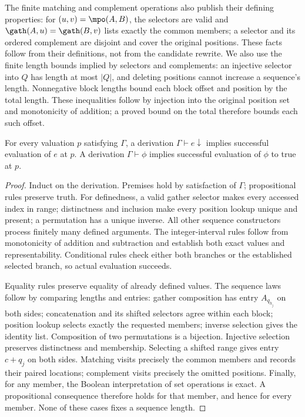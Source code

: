 The finite matching and complement operations also publish their defining
properties: for $(u,v)=\mpo(A,B)$, the selectors are valid and
$\gath(A,u)=\gath(B,v)$ lists exactly the common members; a selector and
its ordered complement are disjoint and cover the original positions.
These facts follow from their definitions, not from the candidate rewrite.
We also use the finite length bounds implied by selectors and complements:
an injective selector into $Q$ has length at most $|Q|$, and deleting
positions cannot increase a sequence's length. Nonnegative block lengths
bound each block offset and position by the total length. These inequalities
follow by injection into the original position set and monotonicity of
addition; a proved bound on the total therefore bounds each such offset.

\begin{lemma}
\label{lem:metadata-soundness}
For every valuation $p$ satisfying $\Gamma$, a derivation
$\Gamma\vdash e\downarrow$ implies successful evaluation of $e$ at $p$.
A derivation $\Gamma\vdash\phi$ implies successful evaluation of $\phi$
to true at $p$.
\end{lemma}
\begin{proof}
Induct on the derivation. Premises hold by satisfaction of $\Gamma$;
propositional rules preserve truth. For definedness, a valid gather selector
makes every accessed index in range; distinctness and inclusion make every
position lookup unique and present; a permutation has a unique inverse.
All other sequence constructors process finitely many defined arguments.
The integer-interval rules follow from monotonicity of addition and
subtraction and establish both exact values and representability.
Conditional rules check either both branches or the established selected
branch, so actual evaluation succeeds.

Equality rules preserve equality of already defined values. The sequence
laws follow by comparing lengths and entries: gather composition has entry
$A_{q_{h_j}}$ on both sides; concatenation and its shifted selectors agree
within each block; position lookup selects exactly the requested members;
inverse selection gives the identity list. Composition of two permutations
is a bijection. Injective selection preserves distinctness and membership.
Selecting a shifted range gives entry $c+q_j$ on both sides.
Matching visits precisely the common members and records their paired
locations; complement visits precisely the omitted positions. Finally,
for any member, the Boolean interpretation of set operations is exact.
A propositional consequence therefore holds for that member, and hence
for every member. None of these cases fixes a sequence length.
\end{proof}

